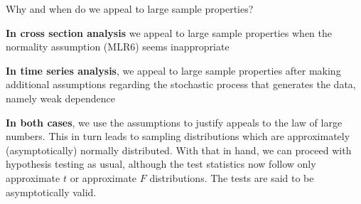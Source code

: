 

\question Why and when do we appeal to large sample properties?

\begin{solution}
  \textbf{In cross section analysis} we appeal to large sample properties when the normality assumption (MLR6) seems 
  inappropriate
  
  \textbf{In time series analysis}, we appeal to large sample properties after making additional 
  assumptions regarding the stochastic process that generates the data, namely weak dependence
  
  \textbf{In both cases}, we use the assumptions to justify appeals to the law of large numbers. This in turn leads to sampling 
  distributions which are approximately (asymptotically) normally distributed. With that in hand, we can proceed 
  with hypothesis testing as usual, although the test statistics now follow only approximate \(t\) or 
  approximate \(F\) distributions. The tests are said to be asymptotically valid.
\end{solution}

